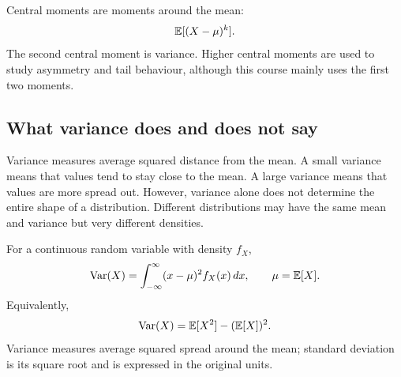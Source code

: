 Central moments are moments around the mean:
\[
\mathbb{E}[(X-
\mu)^k].
\]
The second central moment is variance. Higher central moments are used to study
asymmetry and tail behaviour, although this course mainly uses the first two
moments.

\subsection*{What variance does and does not say}

Variance measures average squared distance from the mean. A small variance means
that values tend to stay close to the mean. A large variance means that values
are more spread out. However, variance alone does not determine the entire shape
of a distribution. Different distributions may have the same mean and variance
but very different densities.

\begin{summarybox}
For a continuous random variable with density \(f_X\),
\[
\operatorname{Var}(X)=\int_{-\infty}^{\infty}(x-
\mu)^2f_X(x)\,dx,
\qquad
\mu=\mathbb{E}[X].
\]
Equivalently,
\[
\operatorname{Var}(X)=\mathbb{E}[X^2]-(\mathbb{E}[X])^2.
\]
Variance measures average squared spread around the mean; standard deviation is
its square root and is expressed in the original units.
\end{summarybox}
